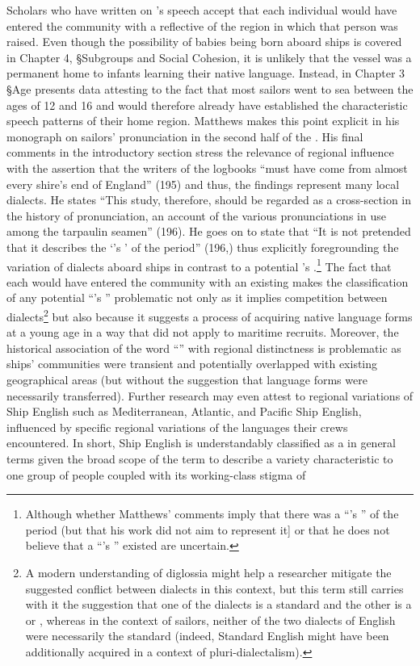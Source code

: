 {Scholars who have written on ’s speech accept that each individual  would have entered the community with a  reflective of the region in which that person was raised.} Even though the possibility of babies being born aboard ships is covered in Chapter 4, §Subgroups and Social Cohesion, it is unlikely that the vessel was a permanent home to infants learning their native language. Instead, in Chapter 3 §Age presents data attesting to the fact that most sailors went to sea between the ages of 12 and 16 and would therefore already have established the characteristic speech patterns of their home region. Matthews makes this point explicit in his monograph on sailors’ pronunciation in the second half of the . His final comments in the introductory section stress the relevance of regional influence with the assertion that the writers of the logbooks “must have come from almost every shire’s end of England” (195) and thus, the findings represent many local dialects. He states “This study, therefore, should be regarded as a cross-section in the history of pronunciation, an account of the various pronunciations in use among the tarpaulin seamen” (196). He goes on to state that “It is not pretended that it describes the ‘’s ’ of the period” (196,) thus explicitly foregrounding the variation of dialects aboard ships in contrast to a potential ’s .\footnote{Although whether Matthews’ comments imply that there was a “’s ” of the period (but that his work did not aim to represent it] or that he does not believe that a “’s ” existed are uncertain.}  The fact that each  would have entered the community with an existing  makes the classification of any potential “’s ” problematic not only as it implies competition between dialects\footnote{A modern understanding of diglossia might help a researcher mitigate the suggested conflict between dialects in this context, but this term still carries with it the suggestion that one of the dialects is a standard and the other is a  or , whereas in the context of sailors, neither of the two dialects of English were necessarily the standard (indeed, Standard English might have been additionally acquired in a context of pluri-dialectalism).}  but also because it suggests a process of acquiring native language forms at a young age in a way that did not apply to maritime recruits. Moreover, the historical association of the word “” with regional distinctness is problematic as ships’ communities were transient and potentially overlapped with existing geographical  areas (but without the suggestion that language forms were necessarily transferred). Further research may even attest to regional variations of Ship English such as Mediterranean, Atlantic, and Pacific Ship English, influenced by specific regional variations of the languages their crews encountered. In short, Ship English is understandably classified as a  in general terms given the broad scope of the term to describe a variety characteristic to one group of people coupled with its working-class stigma of 